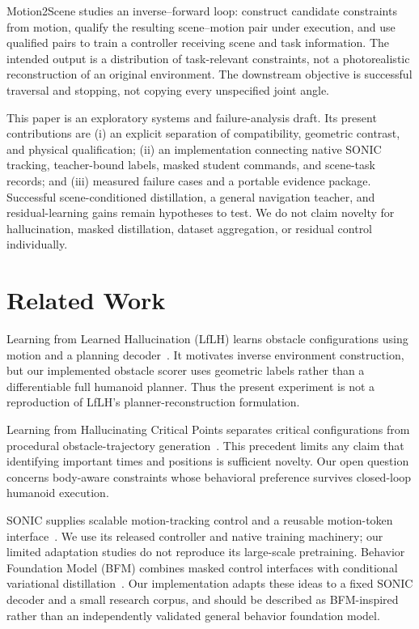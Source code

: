 \documentclass[10pt,twocolumn]{article}
\begin{document}
Motion2Scene studies an inverse--forward loop: construct candidate constraints from motion, qualify the resulting scene--motion pair under execution, and use qualified pairs to train a controller receiving scene and task information. The intended output is a distribution of task-relevant constraints, not a photorealistic reconstruction of an original environment. The downstream objective is successful traversal and stopping, not copying every unspecified joint angle.

This paper is an exploratory systems and failure-analysis draft. Its present contributions are (i) an explicit separation of compatibility, geometric contrast, and physical qualification; (ii) an implementation connecting native SONIC tracking, teacher-bound labels, masked student commands, and scene-task records; and (iii) measured failure cases and a portable evidence package. Successful scene-conditioned distillation, a general navigation teacher, and residual-learning gains remain hypotheses to test. We do not claim novelty for hallucination, masked distillation, dataset aggregation, or residual control individually.

\section{Related Work}
Learning from Learned Hallucination (LfLH) learns obstacle configurations using motion and a planning decoder~\cite{lflh}. It motivates inverse environment construction, but our implemented obstacle scorer uses geometric labels rather than a differentiable full humanoid planner. Thus the present experiment is not a reproduction of LfLH's planner-reconstruction formulation.

Learning from Hallucinating Critical Points separates critical configurations from procedural obstacle-trajectory generation~\cite{critical}. This precedent limits any claim that identifying important times and positions is sufficient novelty. Our open question concerns body-aware constraints whose behavioral preference survives closed-loop humanoid execution.

SONIC supplies scalable motion-tracking control and a reusable motion-token interface~\cite{sonic}. We use its released controller and native training machinery; our limited adaptation studies do not reproduce its large-scale pretraining. Behavior Foundation Model (BFM) combines masked control interfaces with conditional variational distillation~\cite{bfm}. Our implementation adapts these ideas to a fixed SONIC decoder and a small research corpus, and should be described as BFM-inspired rather than an independently validated general behavior foundation model.
\end{document}
